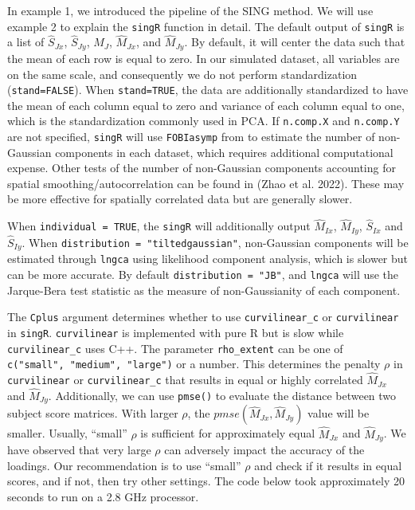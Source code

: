 In example 1, we introduced the pipeline of the SING method. We will use example 2 to explain the \texttt{singR} function in detail. The default output of \texttt{singR} is a list of \(\widehat{S}_{Jx}\), \(\widehat{S}_{Jy}\), \(\widehat{M}_{J}\), \(\widehat{M}_{Jx}\), and \(\widehat{M}_{Jy}\). By default, it will center the data such that the mean of each row is equal to zero. In our simulated dataset, all variables are on the same scale, and consequently we do not perform standardization (\texttt{stand=FALSE}). When \texttt{stand=TRUE}, the data are additionally standardized to have the mean of each column equal to zero and variance of each column equal to one, which is the standardization commonly used in PCA. If \texttt{n.comp.X} and \texttt{n.comp.Y} are not specified, \texttt{singR} will use \texttt{FOBIasymp} from  to estimate the number of non-Gaussian components in each dataset, which requires additional computational expense. Other tests of the number of non-Gaussian components accounting for spatial smoothing/autocorrelation can be found in (Zhao et al. 2022). These may be more effective for spatially correlated data but are generally slower.

When \texttt{individual\ =\ TRUE}, the \texttt{singR} will additionally output \(\widehat{M}_{Ix}\), \(\widehat{M}_{Iy}\), \(\widehat{S}_{Ix}\) and \(\widehat{S}_{Iy}\). When \texttt{distribution\ =\ "tiltedgaussian"}, non-Gaussian components will be estimated through \texttt{lngca} using likelihood component analysis, which is slower but can be more accurate. By default \texttt{distribution\ =\ "JB"}, and \texttt{lngca} will use the Jarque-Bera test statistic as the measure of non-Gaussianity of each component.

The \texttt{Cplus} argument determines whether to use \texttt{curvilinear\_c} or \texttt{curvilinear} in \texttt{singR}. \texttt{curvilinear} is implemented with pure R but is slow while \texttt{curvilinear\_c} uses C++. The parameter \texttt{rho\_extent} can be one of \texttt{c("small",\ "medium",\ "large")} or a number. This determines the penalty \(\rho\) in \texttt{curvilinear} or \texttt{curvilinear\_c} that results in equal or highly correlated \(\widehat{M}_{Jx}\) and \(\widehat{M}_{Jy}\). Additionally, we can use \texttt{pmse()} to evaluate the distance between two subject score matrices. With larger \(\rho\), the \(pmse\left(\widehat{M}_{Jx}, \widehat{M}_{Jy}\right)\) value will be smaller. Usually, ``small'' \(\rho\) is sufficient for approximately equal \(\widehat{M}_{Jx}\) and \(\widehat{M}_{Jy}\). We have observed that very large \(\rho\) can adversely impact the accuracy of the loadings. Our recommendation is to use ``small'' \(\rho\) and check if it results in equal scores, and if not, then try other settings. The code below took approximately 20 seconds to run on a 2.8 GHz processor.

